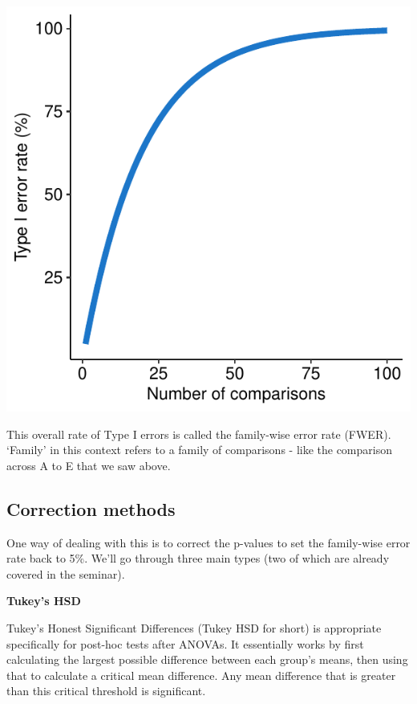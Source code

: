 \documentclass[
]{book}
\begin{document}
\begin{center}\includegraphics{_main_files/figure-latex/unnamed-chunk-158-1} \end{center}

This overall rate of Type I errors is called the family-wise error rate
(FWER). `Family' in this context refers to a family of comparisons -
like the comparison across A to E that we saw above.

\hypertarget{correction-methods}{%
\subsection{Correction methods}\label{correction-methods}}

One way of dealing with this is to correct the p-values to set the
family-wise error rate back to 5\%. We'll go through three main types
(two of which are already covered in the seminar).

\textbf{Tukey's HSD}

Tukey's Honest Significant Differences (Tukey HSD for short) is
appropriate specifically for post-hoc tests after ANOVAs. It essentially
works by first calculating the largest possible difference between each
group's means, then using that to calculate a critical mean difference.
Any mean difference that is greater than this critical threshold is
significant.
\end{document}
